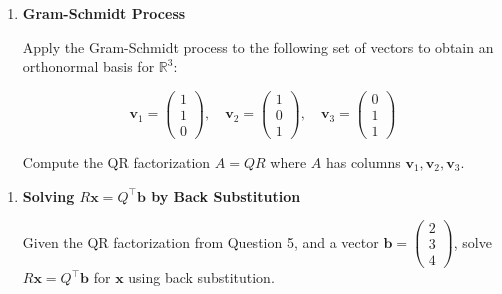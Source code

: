 \documentclass[
]{article}
\begin{document}
\newpage

\begin{enumerate}
\def\labelenumi{\arabic{enumi}.}
\setcounter{enumi}{4}
\item
  \textbf{Gram-Schmidt Process}

  Apply the Gram-Schmidt process to the following set of vectors to
  obtain an orthonormal basis for \(\mathbb{R}^3\):

  \[
  \mathbf{v}_1 = \begin{pmatrix} 1 \\ 1 \\ 0 \end{pmatrix}, \quad
  \mathbf{v}_2 = \begin{pmatrix} 1 \\ 0 \\ 1 \end{pmatrix}, \quad
  \mathbf{v}_3 = \begin{pmatrix} 0 \\ 1 \\ 1 \end{pmatrix}
  \]

  Compute the QR factorization \(A = QR\) where \(A\) has columns
  \(\mathbf{v}_1, \mathbf{v}_2, \mathbf{v}_3\).
\end{enumerate}

\newpage

\begin{enumerate}
\def\labelenumi{\arabic{enumi}.}
\setcounter{enumi}{5}
\item
  \textbf{Solving \(R\mathbf{x} = Q^\top\mathbf{b}\) by Back
  Substitution}

  Given the QR factorization from Question 5, and a vector
  \(\mathbf{b} = \begin{pmatrix} 2 \\ 3 \\ 4 \end{pmatrix}\), solve
  \(R\mathbf{x} = Q^\top\mathbf{b}\) for \(\mathbf{x}\) using back
  substitution.
\end{enumerate}

\newpage
\end{document}
